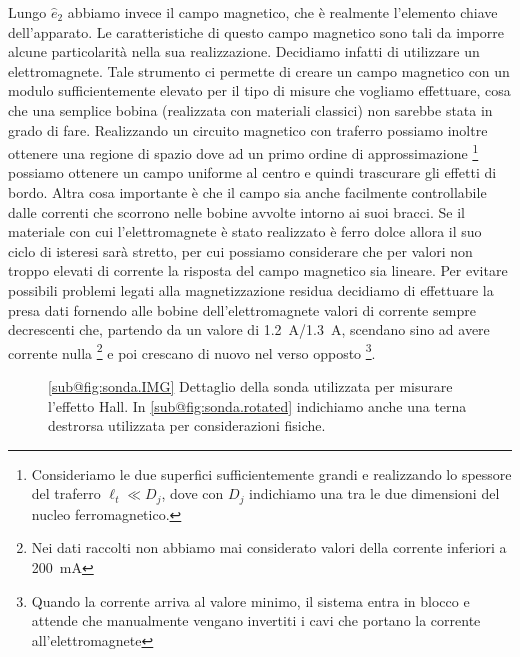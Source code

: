 \documentclass[
    prl,
    reprint, 
    superscriptaddress, 
    altaffilletter, 
    amsmath, 
    amssymb, 
    a4paper,
    varvw]{revtex4-2}
\begin{document}
Lungo $\hat{e}_2$ abbiamo invece il campo magnetico, che è realmente l'elemento chiave dell'apparato. Le caratteristiche di questo campo magnetico sono tali da imporre alcune particolarità nella sua realizzazione. 
Decidiamo infatti di utilizzare un elettromagnete. Tale strumento ci permette di creare un campo magnetico con un modulo sufficientemente elevato per il tipo di misure che vogliamo effettuare, cosa che una semplice bobina (realizzata con materiali classici) non sarebbe stata in grado di fare. Realizzando un circuito magnetico con traferro possiamo inoltre ottenere una regione di spazio dove ad un primo ordine di approssimazione \footnote{Consideriamo le due superfici sufficientemente grandi e realizzando lo spessore del traferro $\ell_t\ll D_j$, dove con $D_j$ indichiamo una tra le due dimensioni del nucleo ferromagnetico.} possiamo ottenere un campo uniforme al centro e quindi trascurare gli effetti di bordo.  Altra cosa importante è che il campo sia anche facilmente controllabile dalle correnti che scorrono nelle bobine avvolte intorno ai suoi bracci. Se il materiale con cui l'elettromagnete è stato realizzato è ferro dolce allora il suo ciclo di isteresi sarà stretto, per cui possiamo considerare che per valori non troppo elevati di corrente la risposta del campo magnetico sia lineare. Per evitare possibili problemi legati alla magnetizzazione residua decidiamo di effettuare la presa dati fornendo alle bobine dell'elettromagnete valori di corrente sempre decrescenti che, partendo da un valore di \SI{1.2}{\ampere}/\SI{1.3}{\ampere}, scendano sino ad avere corrente nulla \footnote{Nei dati raccolti non abbiamo mai considerato valori della corrente inferiori a \SI{200}{\milli\ampere}} e poi crescano di nuovo nel verso opposto \footnote{Quando la corrente arriva al valore minimo, il sistema entra in blocco e attende che manualmente vengano invertiti i cavi che portano la corrente all'elettromagnete}.

\begin{figure}
    \hspace{5mm}
    \caption{\ref{sub@fig:sonda.IMG} Dettaglio della sonda utilizzata per misurare l'effetto Hall. In \ref{sub@fig:sonda.rotated} indichiamo anche una terna destrorsa utilizzata per considerazioni fisiche. }\label{fig:misc}
\end{figure}
\end{document}
